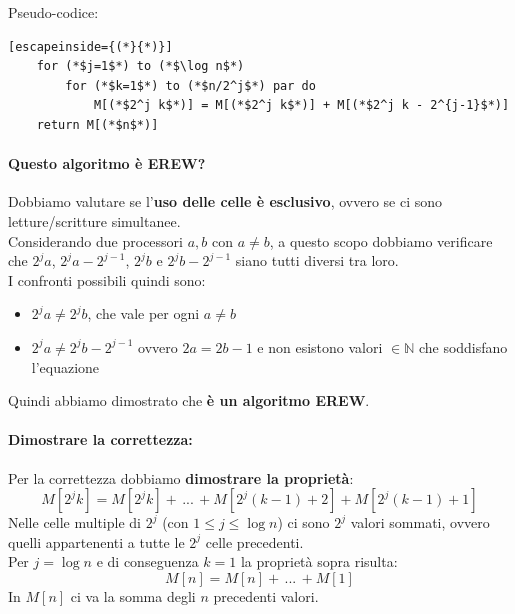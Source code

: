 \documentclass[11pt]{article}
\begin{document}
	Pseudo-codice:
	\begin{lstlisting}[escapeinside={(*}{*)}]
	for (*$j=1$*) to (*$\log n$*)
		for (*$k=1$*) to (*$n/2^j$*) par do
			M[(*$2^j k$*)] = M[(*$2^j k$*)] + M[(*$2^j k - 2^{j-1}$*)]
	return M[(*$n$*)]
	\end{lstlisting}
	
	
	\paragraph{Questo algoritmo è EREW?} Dobbiamo valutare se l'\textbf{uso delle celle è esclusivo}, ovvero se ci sono letture/scritture simultanee.\\
	
	Considerando due processori $a,b$ con $a \neq b$, a questo scopo dobbiamo verificare che $2^j a$, $2^j a - 2^{j-1}$, $2^j b$ e $2^j b - 2^{j-1}$ siano tutti diversi tra loro.\\
	
	I confronti possibili quindi sono:
	\begin{itemize}
		\item $2^j a \neq 2^j b$, che vale per ogni $a \neq b$
		\item $2^j a \neq 2^jb - 2^{j-1}$ ovvero $2 a = 2b - 1$ e non esistono valori $\in \mathbb{N}$ che soddisfano l'equazione
	\end{itemize}
	
	Quindi abbiamo dimostrato che \textbf{è un algoritmo EREW}.
	
	\newpage
	
	\paragraph{Dimostrare la correttezza:} Per la correttezza dobbiamo \textbf{dimostrare la proprietà}:
	$$ M[2^j k] = M[2^j k] + \, ... \, + M[2^j (k-1) + 2] + M[2^j (k-1) + 1] $$
	Nelle celle multiple di $2^j$ (con $1 \leq j \leq \log n$) ci sono $2^j$ valori sommati, ovvero quelli appartenenti a tutte le $2^j$ celle precedenti.\\
	
	Per $j = \log n$ e di conseguenza $k=1$ la proprietà sopra risulta:
	$$ M[n] = M[n] + \, ... \, + M[1] $$
	In $M[n]$ ci va la somma degli $n$ precedenti valori.\\
	
\end{document}
